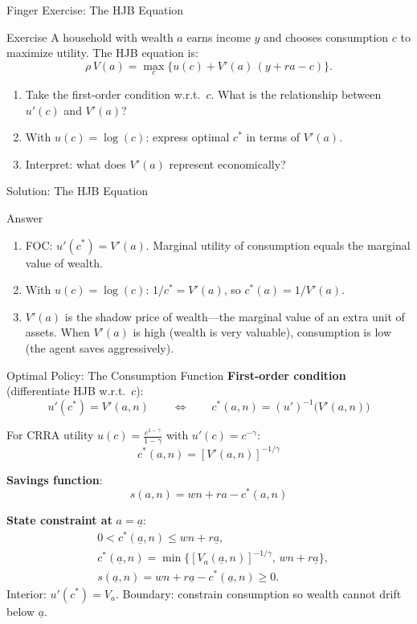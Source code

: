\documentclass[aspectratio=169,11pt]{beamer}
\newcommand{\emphc}[1]{\textcolor{harvardcrimson}{#1}}
\newcommand{\ubar}[1]{\underline{#1}}
\begin{document}
\begin{frame}{\exercisepause{} Finger Exercise: The HJB Equation}
\begin{exampleblock}{Exercise}
A household with wealth $a$ earns income $y$ and chooses consumption $c$ to maximize utility.  The HJB equation is:
\[
\rho\, V(a) = \max_{c} \bigl\{ u(c) + V'(a)\,(y + ra - c) \bigr\}.
\]
\begin{enumerate}
    \item Take the first-order condition w.r.t.\ $c$.  What is the relationship between $u'(c)$ and $V'(a)$?
    \item With $u(c) = \log(c)$: express optimal $c^*$ in terms of $V'(a)$.
    \item Interpret: what does $V'(a)$ represent economically?
\end{enumerate}
\end{exampleblock}
\end{frame}

\begin{frame}{Solution: The HJB Equation}
\begin{block}{Answer}
\begin{enumerate}
    \item FOC: $u'(c^*) = V'(a)$.  Marginal utility of consumption equals the marginal value of wealth.
    \item With $u(c) = \log(c)$: $1/c^* = V'(a)$, so $c^*(a) = 1/V'(a)$.
    \item $V'(a)$ is the \emphc{shadow price of wealth}---the marginal value of an extra unit of assets.  When $V'(a)$ is high (wealth is very valuable), consumption is low (the agent saves aggressively).
\end{enumerate}
\end{block}
\end{frame}

\begin{frame}{Optimal Policy: The Consumption Function}
\small
\textbf{First-order condition} (differentiate HJB w.r.t.\ $c$):
\[
u'(c^*) = V'(a,n) \qquad\Longleftrightarrow\qquad \boxed{c^*(a,n) = (u')^{-1}\!\big(V'(a,n)\big)}
\]

For CRRA utility $u(c) = \frac{c^{1-\gamma}}{1-\gamma}$ with $u'(c) = c^{-\gamma}$:
\[
c^*(a,n) = \left[V'(a,n)\right]^{-1/\gamma}
\]

\vspace{0.1em}
\textbf{Savings function}:
\[
s(a,n) = wn + ra - c^*(a,n)
\]

\vspace{0.1em}
\textbf{State constraint at }$a=\ubar{a}$:
\[
\begin{aligned}
&0<c^*(\ubar a,n)\le wn+r\ubar a,\\
&c^*(\ubar a,n)=\min\{[V_a(\ubar a,n)]^{-1/\gamma},\,wn+r\ubar a\},\\
&s(\ubar a,n)=wn+r\ubar a-c^*(\ubar a,n)\ge 0.
\end{aligned}
\]
{\scriptsize Interior: $u'(c^*)=V_a$. Boundary: constrain consumption so wealth cannot drift below $\ubar a$.}
\end{frame}
\end{document}
